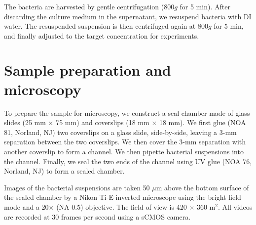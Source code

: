 \documentclass[twocolumn,aps,prx,amsmath,amssymb,longbibliography]{revtex4-2}
\begin{document}
The bacteria are harvested by gentle centrifugation ($800g$ for 5 min). After discarding the culture medium in the supernatant, we resuspend bacteria with DI water. The resuspended suspension is then centrifuged again at $800g$ for 5 min, and finally adjusted to the target concentration for experiments.

\section{Sample preparation and microscopy}

To prepare the sample for microscopy, we construct a seal chamber made of glass slides (25 mm $\times$ 75 mm) and coverslips (18 mm $\times$ 18 mm). We first glue (NOA 81, Norland, NJ) two coverslips on a glass slide, side-by-side, leaving a 3-mm separation between the two coverslips. We then cover the 3-mm separation with another coverslip to form a channel. We then pipette bacterial suspensions into the channel. Finally, we seal the two ends of the channel using UV glue (NOA 76, Norland, NJ) to form a sealed chamber.

Images of the bacterial suspensions are taken 50 $\mu$m above the bottom surface of the sealed chamber by a Nikon Ti-E inverted microscope using the bright field mode and a 20$\times$ (NA 0.5) objective. The field of view is 420 $\times$ 360 \textmu m$^2$. All videos are recorded at 30 frames per second using a sCMOS camera.


\end{document}
